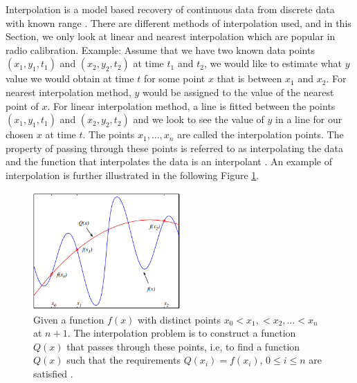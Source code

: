 Interpolation is a model based recovery of continuous data from discrete data with known range \citep{thevenaz2000image}. There are different methods of interpolation used, and in this Section, we only look at linear and nearest interpolation which are popular in radio calibration. Example: Assume that we have two known data points $(x_1,y_1,t_1)$ and  $(x_2,y_2,t_2)$ at time $t_1$ and $t_2$, we would like to estimate what $y$ value we would obtain at time $t$ for some point $x$ that is between $x_1$ and $x_2$. For nearest interpolation method, $y$ would be assigned to the value of the nearest point of $x$. For linear interpolation method, a line is fitted between the points $(x_1,y_1,t_1)$ and $(x_2,y_2,t_2)$  and we look to see the value of $y$ in a line for our chosen $x$ at time $t$. The points $x_1,\dots, x_n$ are called the interpolation points. The property of passing
through these points is referred to as interpolating the data and the function that interpolates the data is an interpolant \citep{levy2010introduction}. An example of interpolation is further illustrated in the following Figure \ref{int}. 

  \begin{figure}[H]
  \centering
    \includegraphics[width=0.5\textwidth]{images/Int.png}
    \caption{Given a function $f(x)$ with distinct points $x_0<x_1,<x_2,\dots <x_n$ at $n+1$. The interpolation problem is to construct a function $Q(x)$ that passes through these points, i.e, to find a function $Q(x)$ such that the requirements $Q(x_i)=f(x_i)$, $0\leq i\leq n$ are satisfied \citep{levy2010introduction}.}
  \label{int}
\end{figure}

